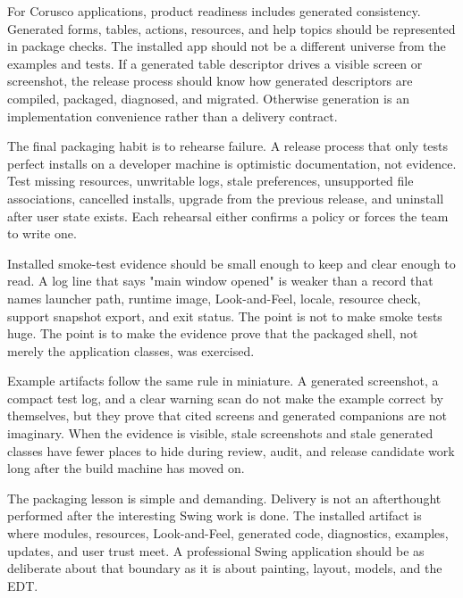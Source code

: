 For Corusco applications, product readiness includes generated consistency. Generated forms, tables, actions, resources, and help topics should be represented in package checks. The installed app should not be a different universe from the examples and tests. If a generated table descriptor drives a visible screen or screenshot, the release process should know how generated descriptors are compiled, packaged, diagnosed, and migrated. Otherwise generation is an implementation convenience rather than a delivery contract.

The final packaging habit is to rehearse failure. A release process that only tests perfect installs on a developer machine is optimistic documentation, not evidence. Test missing resources, unwritable logs, stale preferences, unsupported file associations, cancelled installs, upgrade from the previous release, and uninstall after user state exists. Each rehearsal either confirms a policy or forces the team to write one.

Installed smoke-test evidence should be small enough to keep and clear enough to read. A log line that says "main window opened" is weaker than a record that names launcher path, runtime image, Look-and-Feel, locale, resource check, support snapshot export, and exit status. The point is not to make smoke tests huge. The point is to make the evidence prove that the packaged shell, not merely the application classes, was exercised.

Example artifacts follow the same rule in miniature. A generated screenshot, a compact test log, and a clear warning scan do not make the example correct by themselves, but they prove that cited screens and generated companions are not imaginary. When the evidence is visible, stale screenshots and stale generated classes have fewer places to hide during review, audit, and release candidate work long after the build machine has moved on.

The packaging lesson is simple and demanding. Delivery is not an afterthought performed after the interesting Swing work is done. The installed artifact is where modules, resources, Look-and-Feel, generated code, diagnostics, examples, updates, and user trust meet. A professional Swing application should be as deliberate about that boundary as it is about painting, layout, models, and the EDT.
